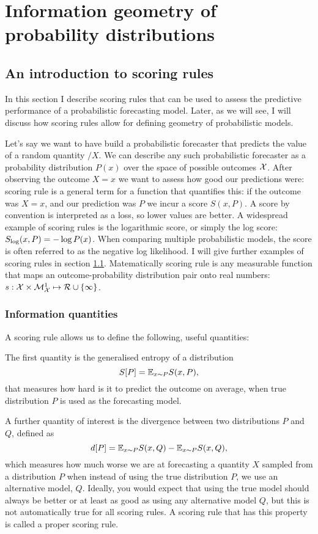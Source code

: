 
\part{Information geometry of probability distributions}

\chapter{An introduction to scoring rules}

In this section I describe scoring rules that can be used to assess the predictive performance of a probabilistic forecasting model. Later, as we will see, I will discuss how scoring rules allow for defining geometry of probabilistic models.

Let's say we want to have build a probabilistic forecaster that predicts the value of a random quantity $/X$. We can describe any such probabilistic forecaster as a probability distribution $P(x)$ over the space of possible outcomes $\mathcal{X}$. After observing the outcome $X=x$ we want to assess how good our predictions were: scoring rule is a general term for a function that quantifies this: if the outcome was $X=x$, and our prediction was $P$ we incur a score $S(x,P)$. A score by convention is interpreted as a loss, so lower values are better. A widespread example of scoring rules is the logarithmic score, or simply the log score: $S_{\log}(x,P) = -\log P(x)$. When comparing multiple probabilistic models, the score is often referred to as the negative log likelihood. I will give further examples of scoring rules in section \ref{}. Matematically scoring rule is any measurable function that maps an outcome-probability distribution pair onto real numbers: $s:\mathcal{X}\times\mathcal{M}^{1}_{\mathcal{X}}\mapsto\mathcal{R}\cup\{\infty\}$.

\section{Information quantities}
 A scoring rule allows us to define the following, useful quantities:

The first quantity is the generalised entropy of a distribution
\begin{equation}
	S[P] = \mathbb{E}_{x\sim P} S(x,P)\mbox{,}
\end{equation}
that measures how hard is it to predict the outcome on average, when true distribution $P$ is used as the forecasting model.

A further quantity of interest is the divergence between two distributions $P$ and $Q$, defined as
\begin{equation}
	d[P] = \mathbb{E}_{x\sim P} S(x,Q) - \mathbb{E}_{x\sim P} S(x,Q)\mbox{,}
\end{equation}
which measures how much worse we are at forecasting a quantity $X$ sampled from a distribution $P$ when instead of using the true distribution $P$, we use an alternative model, $Q$. Ideally, you would expect that using the true model should always be better or at least as good as using any alternative model $Q$, but this is not automatically true for all scoring rules. A scoring rule that has this property is called a proper scoring rule.

